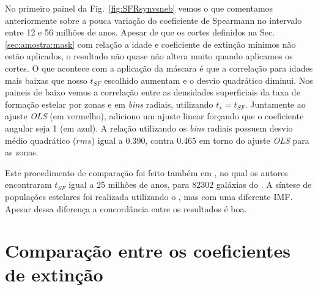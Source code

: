 No primeiro painel da Fig.\ \ref{fig:SFRsynvsneb} vemos o que comentamos anteriormente sobre a pouca
variação do coeficiente de Spearmann no intervalo entre 12 e 56 milhões de anos. Apesar de que os
cortes definidos na Sec. \ref{sec:amostra:mask} com relação a idade e coeficiente de extinção
mínimos não estão aplicados, o resultado não quase não altera muito quando aplicamos os cortes. O
que acontece com a aplicação da máscara é que a correlação para idades mais baixas que nosso
$t_{SF}$ escolhido aumentam e o desvio quadrático diminui. Nos paineis de baixo vemos a correlação
entre as densidades superficiais da taxa de formação estelar por zonas e em {\em bins} radiais,
utilizando $t_\star = t_{SF}$. Juntamente ao ajuste {\em OLS} (em vermelho), adiciono um ajuste
linear forçando que o coeficiente angular seja 1 (em azul). A relação utilizando os {\em bins}
radiais possuem desvio médio quadrático ($rms$) igual a 0.390, contra 0.465 em torno do ajuste {\em
OLS} para as zonas.

Este procedimento de comparação foi feito também em \citet{Asari.etal.2007a}, no qual os autores
encontraram $t_{SF}$ igual a 25 milhões de anos, para 82302 galáxias do \SDSS. A síntese de
populações estelares foi realizada utilizando o \starlight, mas com uma diferente IMF. Apesar dessa
diferença a concordância entre os resultados é boa.


\section{Comparação entre os coeficientes de extinção}
\label{apendice:synvsneb:tauv}

